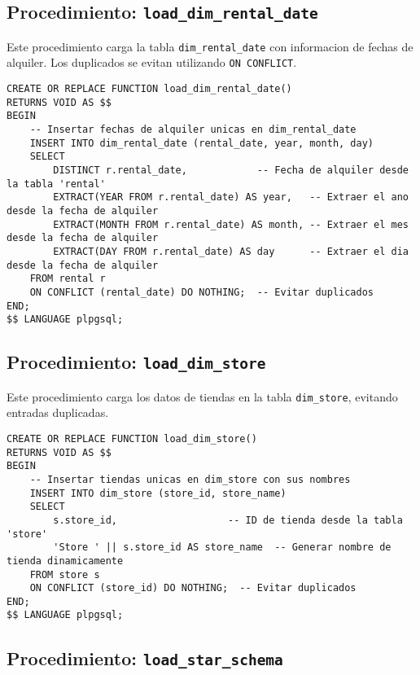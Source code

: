 \documentclass{article}
\begin{document}
\newpage
\subsection{Procedimiento: \texttt{load\_dim\_rental\_date}}

Este procedimiento carga la tabla \texttt{dim\_rental\_date} con informacion de fechas de alquiler. Los duplicados se evitan utilizando \texttt{ON CONFLICT}.

\begin{lstlisting}
CREATE OR REPLACE FUNCTION load_dim_rental_date()
RETURNS VOID AS $$
BEGIN
    -- Insertar fechas de alquiler unicas en dim_rental_date
    INSERT INTO dim_rental_date (rental_date, year, month, day)
    SELECT 
        DISTINCT r.rental_date,            -- Fecha de alquiler desde la tabla 'rental'
        EXTRACT(YEAR FROM r.rental_date) AS year,   -- Extraer el ano desde la fecha de alquiler
        EXTRACT(MONTH FROM r.rental_date) AS month, -- Extraer el mes desde la fecha de alquiler
        EXTRACT(DAY FROM r.rental_date) AS day      -- Extraer el dia desde la fecha de alquiler
    FROM rental r
    ON CONFLICT (rental_date) DO NOTHING;  -- Evitar duplicados
END;
$$ LANGUAGE plpgsql;
\end{lstlisting}

\subsection{Procedimiento: \texttt{load\_dim\_store}}

Este procedimiento carga los datos de tiendas en la tabla \texttt{dim\_store}, evitando entradas duplicadas.

\begin{lstlisting}
CREATE OR REPLACE FUNCTION load_dim_store()
RETURNS VOID AS $$
BEGIN
    -- Insertar tiendas unicas en dim_store con sus nombres
    INSERT INTO dim_store (store_id, store_name)
    SELECT 
        s.store_id,                   -- ID de tienda desde la tabla 'store'
        'Store ' || s.store_id AS store_name  -- Generar nombre de tienda dinamicamente
    FROM store s
    ON CONFLICT (store_id) DO NOTHING;  -- Evitar duplicados
END;
$$ LANGUAGE plpgsql;
\end{lstlisting}

\newpage
\subsection{Procedimiento: \texttt{load\_star\_schema}}
\end{document}
